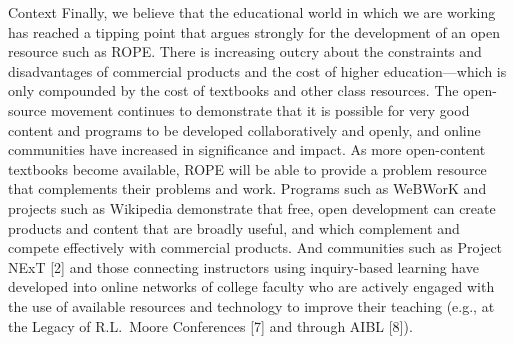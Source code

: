 \documentclass[11pt]{article}
\begin{document}
\begin{section}{Context}
Finally, we believe that the educational world in which we are working has
reached a tipping point that argues strongly for the development of an open
resource such as ROPE.  There is increasing outcry about the constraints
and disadvantages of commercial products and the cost of higher
education---which is only compounded by the cost of textbooks and other
class resources.  The open-source movement continues to demonstrate that
it is possible for very good content and programs to be
developed collaboratively and openly, and online communities have
increased in significance and impact. 
As more
open-content textbooks become available, ROPE will be able to provide a
problem resource that complements their problems and work.  Programs such
as WeBWorK and projects such as Wikipedia demonstrate that free, open
development can create products and content that are broadly useful, and
which complement and compete effectively with commercial products.  And
communities such as Project NExT [2] and those connecting instructors
using inquiry-based learning have developed into online networks of
college faculty who are actively engaged with the use of available
resources and technology to improve their teaching (e.g., at the Legacy of
R.L.~Moore Conferences [7] and through AIBL [8]).

\end{section}
\end{document}
